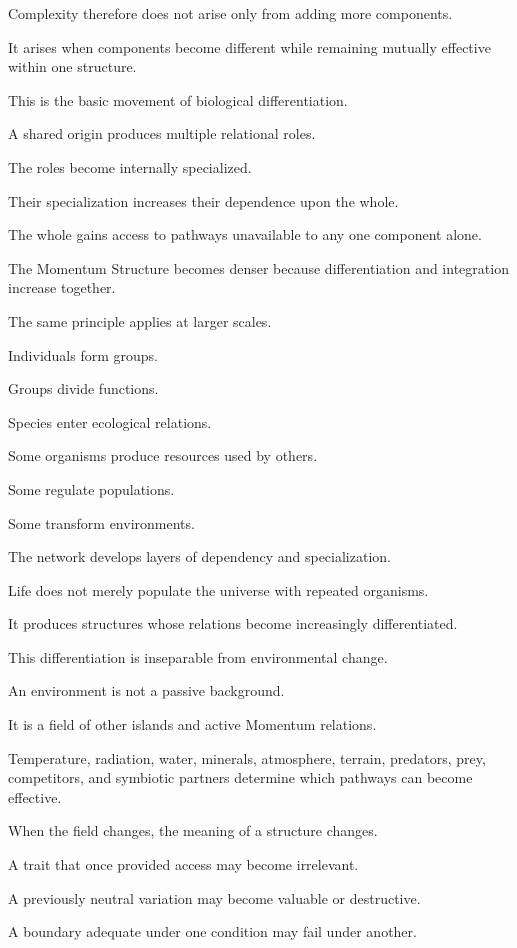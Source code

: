 Complexity therefore does not arise only from adding more components.

It arises when components become different while remaining mutually effective within one structure.

This is the basic movement of biological differentiation.

A shared origin produces multiple relational roles.

The roles become internally specialized.

Their specialization increases their dependence upon the whole.

The whole gains access to pathways unavailable to any one component alone.

The Momentum Structure becomes denser because differentiation and integration increase together.

The same principle applies at larger scales.

Individuals form groups.

Groups divide functions.

Species enter ecological relations.

Some organisms produce resources used by others.

Some regulate populations.

Some transform environments.

The network develops layers of dependency and specialization.

Life does not merely populate the universe with repeated organisms.

It produces structures whose relations become increasingly differentiated.

This differentiation is inseparable from environmental change.

An environment is not a passive background.

It is a field of other islands and active Momentum relations.

Temperature, radiation, water, minerals, atmosphere, terrain, predators, prey, competitors, and symbiotic partners determine which pathways can become effective.

When the field changes, the meaning of a structure changes.

A trait that once provided access may become irrelevant.

A previously neutral variation may become valuable or destructive.

A boundary adequate under one condition may fail under another.

